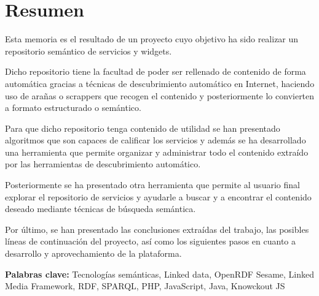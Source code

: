 \cleardoublepage
{}
\chapter*{Resumen}

Esta memoria es el resultado de un proyecto cuyo objetivo ha sido realizar un repositorio semántico de servicios y widgets.

Dicho repositorio tiene la facultad de poder ser rellenado de contenido de forma automática gracias a técnicas de descubrimiento automático en Internet, haciendo uso de arañas o scrappers que recogen el contenido y posteriormente lo convierten a formato estructurado o semántico.

Para que dicho repositorio tenga contenido de utilidad se han presentado algoritmos que son capaces de calificar los servicios y además se ha desarrollado una herramienta que permite organizar y administrar todo el contenido extraído por las herramientas de descubrimiento automático.

Posteriormente se ha presentado otra herramienta que permite al usuario final explorar el repositorio de servicios y ayudarle a buscar y a encontrar el contenido deseado mediante técnicas de búsqueda semántica.

Por último, se han presentado las conclusiones extraídas del trabajo, las posibles líneas de continuación del proyecto, así como los siguientes pasos en cuanto a desarrollo y aprovechamiento de la plataforma.

\vfill
\textbf{Palabras clave:} Tecnologías semánticas, Linked data, OpenRDF Sesame, Linked Media Framework, RDF, SPARQL, PHP, JavaScript, Java, Knowckout JS